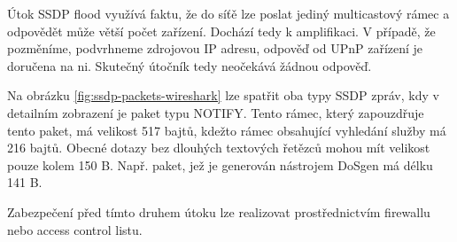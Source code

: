 Útok SSDP flood využívá faktu, že do síťě lze poslat jediný multicastový rámec a odpovědět může větší počet zařízení. Dochází tedy k amplifikaci. V případě, že pozměníme, podvrhneme zdrojovou IP adresu, odpověď od UPnP zařízení je doručena na ni. Skutečný útočník tedy neočekává žádnou odpověď. 

Na obrázku \ref{fig:ssdp-packets-wireshark} lze spatřit oba typy SSDP zpráv, kdy v detailním zobrazení je paket typu NOTIFY. Tento rámec, který zapouzdřuje tento paket, má velikost 517 bajtů, kdežto rámec obsahující vyhledání služby má 216 bajtů. Obecné dotazy bez dlouhých textových řetězců mohou mít velikost pouze kolem 150 B. Např. paket, jež je generován nástrojem DoSgen má délku 141 B.

Zabezpečení před tímto druhem útoku lze realizovat prostřednictvím firewallu nebo access control listu.
